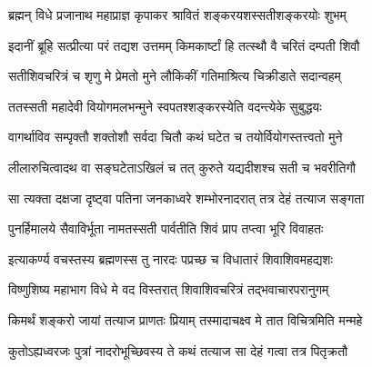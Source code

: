 

\textlink{}

\storymeta


\twolineshloka
{ब्रह्मन् विधे प्रजानाथ महाप्राज्ञ कृपाकर}
{श्रावितं शङ्करयशस्सतीशङ्करयोः शुभम्} %

\twolineshloka
{इदानीं ब्रूहि सत्प्रीत्या परं तद्यश उत्तमम्}
{किमकार्ष्टां हि तत्स्थौ वै चरितं दम्पती शिवौ} %


\twolineshloka
{सतीशिवचरित्रं च शृणु मे प्रेमतो मुने}
{लौकिकीं गतिमाश्रित्य चिक्रीडाते सदान्वहम्} %

\twolineshloka
{ततस्सती महादेवी वियोगमलभन्मुने}
{स्वपतश्शङ्करस्येति वदन्त्येके सुबुद्धयः} %

\twolineshloka
{वागर्थाविव सम्पृक्तौ शक्तोशौ सर्वदा चितौ}
{कथं घटेत च तयोर्वियोगस्तत्त्वतो मुने} %

\twolineshloka
{लीलारुचित्वादथ वा सङ्घटेताऽखिलं च तत्}
{कुरुते यद्यदीशश्च सती च भवरीतिगौ} %

\twolineshloka
{सा त्यक्ता दक्षजा दृष्ट्वा पतिना जनकाध्वरे}
{शम्भोरनादरात् तत्र देहं तत्याज सङ्गता} %

\twolineshloka
{पुनर्हिमालये सैवाविर्भूता नामतस्सती}
{पार्वतीति शिवं प्राप तप्त्वा भूरि विवाहतः} %


\twolineshloka
{इत्याकर्ण्य वचस्तस्य ब्रह्मणस्स तु नारदः}
{पप्रच्छ च विधातारं शिवाशिवमहद्यशः} %


\twolineshloka
{विष्णुशिष्य महाभाग विधे मे वद विस्तरात्}
{शिवाशिवचरित्रं तद्भवाचारपरानुगम्} %

\twolineshloka
{किमर्थं शङ्करो जायां तत्याज प्राणतः प्रियाम्}
{तस्मादाचक्ष्व मे तात विचित्रमिति मन्महे} %

\twolineshloka
{कुतोऽह्यध्वरजः पुत्रां नादरोभूच्छिवस्य ते}
{कथं तत्याज सा देहं गत्वा तत्र पितृक्रतौ} %

